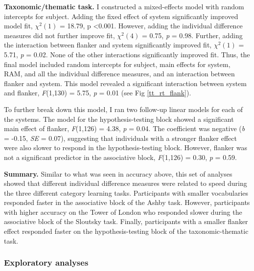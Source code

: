 \documentclass[../dissertation.tex]{subfiles}
\begin{document}
\textbf{Taxonomic/thematic task.}  I constructed a mixed-effects model with random intercepts for subject. Adding the fixed effect of system significantly improved model fit,  $\chi^{2}(1)$ = 18.79, p \textless 0.001. However, adding the individual difference measures did not further improve fit,  $\chi^{2}(4)$ = 0.75, \textit{p} = 0.98. Further, adding the interaction between flanker and system significantly improved fit, $\chi^{2}(1)$ = 5.71, \textit{p} = 0.02. None of the other interactions significantly improved fit. Thus, the final model included random intercepts for subject, main effects for system, RAM, and all the individual difference measures, and an interaction between flanker and system. This model revealed a significant interaction between system and flanker, \textit{F}(1,130) = 5.75, \textit{p} = 0.01 (see Fig \ref{tt_rt_flank}). \par 
	To further break down this model, I ran two follow-up linear models for each of the systems. The model for the hypothesis-testing block showed a significant main effect of flanker, \textit{F}(1,126) = 4.38, \textit{p} = 0.04. The coefficient was negative (\textit{b} = -0.15, \textit{SE} = 0.07), suggesting that individuals with a stronger flanker effect were also slower to respond in the hypothesis-testing block. However, flanker was not a significant predictor in the associative block, \textit{F}(1,126) = 0.30, \textit{p} = 0.59.  \par
\textbf{Summary.} Similar to what was seen in accuracy above, this set of analyses showed that different individual difference measures were related to speed during the three different category learning tasks. Participants with smaller vocabularies responded faster in the associative block of the Ashby task. However, participants with higher accuracy on the Tower of London who responded slower during the associative block of the Sloutsky task. Finally, participants with a smaller flanker effect responded faster on the hypothesis-testing block of the taxonomic-thematic task.

\subsubsection{Exploratory analyses}
\end{document}
